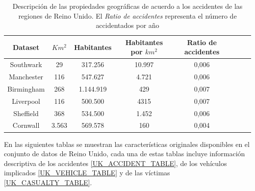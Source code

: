 \begin{table}[h!]
	\begin{center}
		\begin{tabular}{|c|c||c|c|c|c|c|c|}
			\hline
			\textbf{Dataset} & \textbf{$Km^2$} & \textbf{Habitantes} & \textbf{Habitantes por $km^2$} & \textbf{Ratio de accidentes}
			\\ \hline \hline
			Southwark   &  29   &   317.256  & 10.997  & 0,006 \\ \hline
			Manchester  &  116  &   547.627  &  4.721  & 0,006 \\ \hline
			Birmingham  &  268  & 1.144.919  &    429  & 0,007 \\ \hline
			Liverpool   &  116  &   500.500  &   4315  & 0,007 \\ \hline
			Sheffield   &  368  &   534.500  &  1.452  & 0,006  \\ \hline
			Cornwall    & 3.563 &   569.578  &    160  & 0,004 \\ \hline
		\end{tabular}
	\end{center}
	\caption[Descripción de las propiedades geográficas de acuerdo a los accidentes de las regiones de Reino Unido]{Descripción de las propiedades geográficas de acuerdo a los accidentes de las regiones de Reino Unido. El \textit{Ratio de accidentes} representa el número de accidentados por año}
	\label{UK_statistics}
\end{table}


En las siguientes tablas se muestran las características originales disponibles en el conjunto de datos de Reino Unido, cada una de estas tablas incluye información descriptiva de los accidentes \ref{UK_ACCIDENT_TABLE}, de los vehículos implicados \ref{UK_VEHICLE_TABLE} y de las víctimas \ref{UK_CASUALTY_TABLE}.

